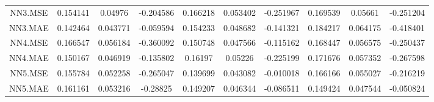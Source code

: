 \begin{longtable}{cccccccccc}
\addlinespace
NN3.MSE & 0.154141 & 0.04976 & -0.204586 & 0.166218 & 0.053402 & -0.251967 & 0.169539 & 0.05661 & -0.251204\\
NN3.MAE & 0.142464 & 0.043771 & -0.059594 & 0.154233 & 0.048682 & -0.141321 & 0.184217 & 0.064175 & -0.418401\\
NN4.MSE & 0.166547 & 0.056184 & -0.360092 & 0.150748 & 0.047566 & -0.115162 & 0.168447 & 0.056575 & -0.250437\\
NN4.MAE & 0.150167 & 0.046919 & -0.135802 & 0.16197 & 0.05226 & -0.225199 & 0.171676 & 0.057352 & -0.267598\\
NN5.MSE & 0.155784 & 0.052258 & -0.265047 & 0.139699 & 0.043082 & -0.010018 & 0.166166 & 0.055027 & -0.216219\\
\addlinespace
NN5.MAE & 0.161161 & 0.053216 & -0.28825 & 0.149207 & 0.046344 & -0.086511 & 0.149424 & 0.047544 & -0.050824\\*
\end{longtable}
\endgroup{}